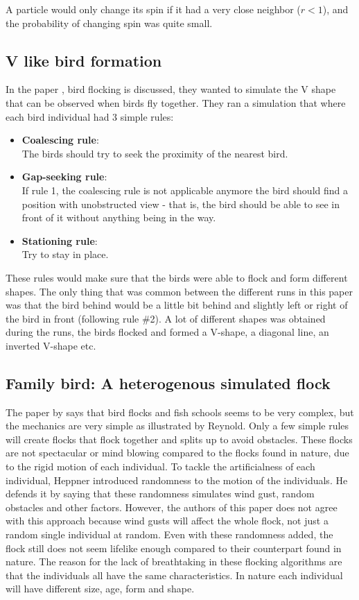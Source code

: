 A particle would only change its spin if it had a very close neighbor ($r<1$), and the probability of changing spin was quite small.

\subsection{V like bird formation}
In the paper \citep{Nathan2008}, bird flocking is discussed, they wanted to simulate the V shape that can be observed when birds fly together. They ran a simulation that where each bird individual had 3 simple rules: 
\begin{itemize}
    \item \textbf{Coalescing rule}: \\
        The birds should try to seek the proximity of the nearest bird.
    \item \textbf{Gap-seeking rule}: \\
        If rule 1, the coalescing rule is not applicable anymore the bird should find a position with unobstructed view -  that is, the bird should be able to see in front of it without anything being in the way.
    \item \textbf{Stationing rule}: \\
        Try to stay in place.
\end{itemize}
These rules would make sure that the birds were able to flock and form different shapes. The only thing that was common between the different runs in this paper was that the bird behind would be a little bit behind and slightly left or right of the bird in front (following rule \#2). A lot of different shapes was obtained during the runs, the birds flocked and formed a V-shape, a diagonal line, an inverted V-shape etc.

\subsection{Family bird: A heterogenous simulated flock}
The paper \citep{Demsar2013} by \citeauthor{Demsar2013} says that bird flocks and fish schools seems to be very complex, but the mechanics are very simple as illustrated by Reynold. Only a few simple rules will create flocks that flock together and splits up to avoid obstacles. These flocks are not spectacular or mind blowing compared to the flocks found in nature, due to the rigid motion of each individual. To tackle the artificialness of each individual, Heppner introduced randomness to the motion of the individuals. He defends it by saying that these randomness simulates wind gust, random obstacles and other factors. 
However, the authors of this paper does not agree with this approach because wind gusts will affect the whole flock, not just a random single individual at random. Even with these randomness added, the flock still does not seem lifelike enough compared to their counterpart found in nature. The reason for the lack of breathtaking in these flocking algorithms are that the individuals all have the same characteristics. In nature each individual will have different size, age, form and shape.
 
